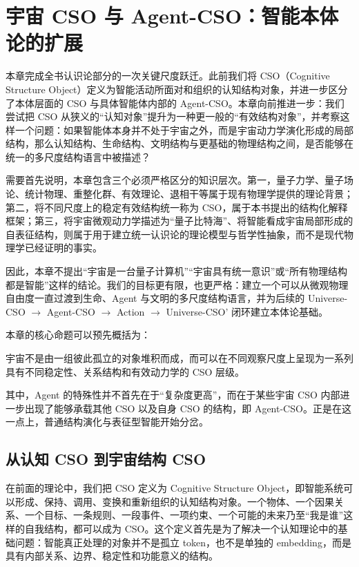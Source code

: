 \chapter{宇宙 CSO 与 Agent-CSO：智能本体论的扩展}

\begin{chapterlead}
本章完成全书认识论部分的一次关键尺度跃迁。此前我们将 CSO（Cognitive Structure Object）定义为智能活动所面对和组织的认知结构对象，并进一步区分了本体层面的 CSO 与具体智能体内部的 Agent-CSO。本章向前推进一步：我们尝试把 CSO 从狭义的“认知对象”提升为一种更一般的“有效结构对象”，并考察这样一个问题：如果智能体本身并不处于宇宙之外，而是宇宙动力学演化形成的局部结构，那么认知结构、生命结构、文明结构与更基础的物理结构之间，是否能够在统一的多尺度结构语言中被描述？

需要首先说明，本章包含三个必须严格区分的知识层次。第一，量子力学、量子场论、统计物理、重整化群、有效理论、退相干等属于现有物理学提供的理论背景；第二，将不同尺度上的稳定有效结构统一称为 CSO，属于本书提出的结构化解释框架；第三，将宇宙微观动力学描述为“量子比特海”、将智能看成宇宙局部形成的自表征结构，则属于用于建立统一认识论的理论模型与哲学性抽象，而不是现代物理学已经证明的事实。

因此，本章不提出“宇宙是一台量子计算机”“宇宙具有统一意识”或“所有物理结构都是智能”这样的结论。我们的目标更有限，也更严格：建立一个可以从微观物理自由度一直过渡到生命、Agent 与文明的多尺度结构语言，并为后续的 Universe-CSO $\rightarrow$ Agent-CSO $\rightarrow$ Action $\rightarrow$ Universe-CSO' 闭环建立本体论基础。

本章的核心命题可以预先概括为：
\begin{statementbox}
宇宙不是由一组彼此孤立的对象堆积而成，而可以在不同观察尺度上呈现为一系列具有不同稳定性、关系结构和有效动力学的 CSO 层级。
\end{statementbox}

其中，Agent 的特殊性并不首先在于“复杂度更高”，而在于某些宇宙 CSO 内部进一步出现了能够承载其他 CSO 以及自身 CSO 的结构，即 Agent-CSO。正是在这一点上，普通结构演化与表征型智能开始分岔。
\end{chapterlead}

\section{从认知 CSO 到宇宙结构 CSO}

在前面的理论中，我们把 CSO 定义为 Cognitive Structure Object，即智能系统可以形成、保持、调用、变换和重新组织的认知结构对象。一个物体、一个因果关系、一个目标、一条规则、一段事件、一项约束、一个可能的未来乃至“我是谁”这样的自我结构，都可以成为 CSO。这个定义首先是为了解决一个认知理论中的基础问题：智能真正处理的对象并不是孤立 token，也不是单独的 embedding，而是具有内部关系、边界、稳定性和功能意义的结构。

